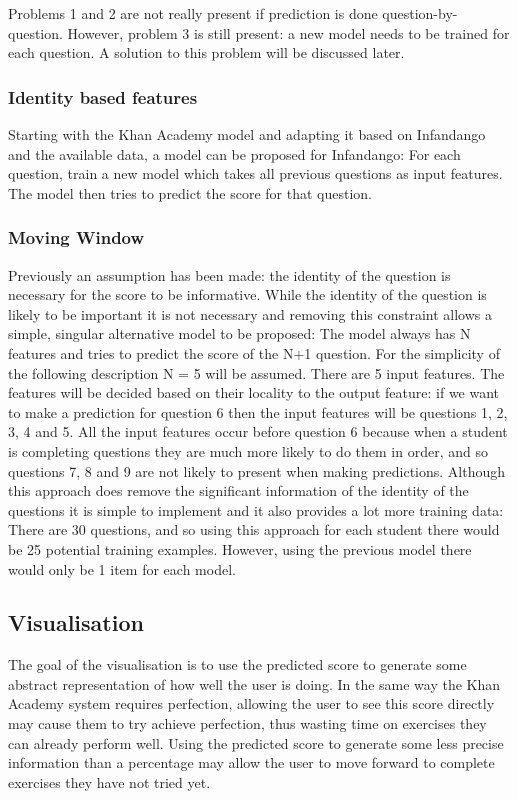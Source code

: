 Problems 1 and 2 are not really present if prediction is done question-by-question. However, problem 3 is still present: a new model needs to be trained for each question. A solution to this problem will be discussed later.

\subsubsection{Identity based features}
Starting with the Khan Academy model and adapting it based on Infandango and the available data, a model can be proposed for Infandango: For each question, train a new model which takes all previous questions as input features. The model then tries to predict the score for that question.

\subsubsection{Moving Window}
Previously an assumption has been made: the identity of the question is necessary for the score to be informative. While the identity of the question is likely to be important it is not necessary and removing this constraint allows a simple, singular alternative model to be proposed: The model always has N features and tries to predict the score of the N+1 question. For the simplicity of the following description N = 5 will be assumed.
There are 5 input features. The features will be decided based on their locality to the output feature: if we want to make a prediction for question 6 then the input features will be questions 1, 2, 3, 4 and 5. All the input features occur before question 6 because when a student is completing questions they are much more likely to do them in order, and so questions 7, 8 and 9 are not likely to present when making predictions. 
Although this approach does remove the significant information of the identity of the questions it is simple to implement and it also provides a lot more training data: There are 30 questions, and so using this approach for each student there would be 25 potential training examples. However, using the previous model there would only be 1 item for each model.

\subsection{Visualisation}
The goal of the visualisation is to use the predicted score to generate some abstract representation of how well the user is doing. In the same way the Khan Academy system requires perfection, allowing the user to see this score directly may cause them to try achieve perfection, thus wasting time on exercises they can already perform well. Using the predicted score to generate some less precise information than a percentage may allow the user to move forward to complete exercises they have not tried yet.

